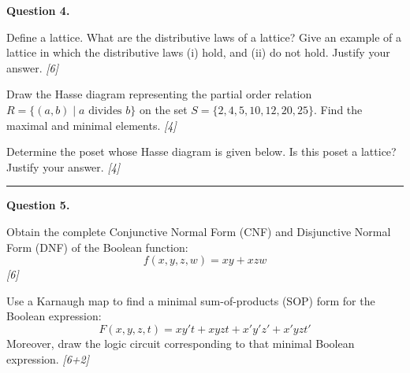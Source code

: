 \documentclass[11pt,a4paper]{article}
\newcommand{\pts}[1]{\hfill   \textit{[#1]}}
\begin{document}
\medskip


\noindent   \textbf{Question 4.}

\begin{parts}
  \item Define a lattice. What are the distributive laws of a lattice? Give an example of a lattice in which the distributive laws (i) hold, and (ii) do not hold. Justify your answer. \pts{6}
  \item Draw the Hasse diagram representing the partial order relation $R = \{(a, b) \mid a  \text{ divides } b\}$ on the set $S = \{2, 4, 5, 10, 12, 20, 25\}$. Find the maximal and minimal elements. \pts{4}
  \item Determine the poset whose Hasse diagram is given below. Is this poset a lattice? Justify your answer. \pts{4}
  
\begin{center}
    
  \end{center}
\end{parts}

\medskip\rule{\linewidth}{0.2pt}

\medskip


\noindent   \textbf{Question 5.}

\begin{parts}
  \item Obtain the complete Conjunctive Normal Form (CNF) and Disjunctive Normal Form (DNF) of the Boolean function:
  \[ f(x, y, z, w) = xy + xzw \] \pts{6}
  \item Use a Karnaugh map to find a minimal sum-of-products (SOP) form for the Boolean expression:
  \[ F(x, y, z, t) = xy't + xyzt + x'y'z' + x'yzt' \]
  Moreover, draw the logic circuit corresponding to that minimal Boolean expression. \pts{6+2}
\end{parts}
\end{document}

